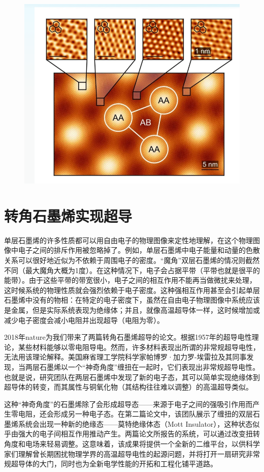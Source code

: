 \documentclass[hyperref,a4paper,UTF8]{ctexart}
\begin{document}
\begin{figure}[h]
	\centering
	\includegraphics[scale=0.6]{figures/sm.png}
\end{figure}

\section{转角石墨烯实现超导}
单层石墨烯的许多性质都可以用自由电子的物理图像来定性地理解，在这个物理图像中电子之间的排斥作用被忽略掉了。例如，单层石墨烯中电子能量和动量的色散关系可以很好地近似为不依赖于周围电子的密度。“魔角”双层石墨烯的情况则截然不同（最大魔角大概为1度）。在这种情况下，电子会占据平带（平带也就是很平的能带）。由于这些平带的带宽很小，电子之间的相互作用不能再当做微扰来处理，这时候系统的物理性质就会强烈依赖于电子密度。这种强相互作用甚至会引起单层石墨烯中没有的物相：在特定的电子密度下，虽然在自由电子物理图像中系统应该是金属，但是实际系统表现为绝缘体；并且，就像高温超导体一样，这时候增加或减少电子密度会减小电阻并出现超导（电阻为零）。

2018年nature为我们带来了两篇转角石墨烯超导的论文。根据1957年的超导电性理论，某些材料能够以零电阻导电。然而，许多材料表现出所谓的非常规超导电性，无法用该理论解释。美国麻省理工学院科学家帕博罗·加力罗-埃雷拉及其同事发现，当两层石墨烯以一个“神奇角度”缠扭在一起时，它们表现出非常规超导电性。也就是说，研究团队在两层石墨烯中发现了新的电子态，其可以简单实现绝缘体到超导体的转变，而其属性与铜氧化物（其结构往往难以调整）的高温超导类似。

这种“神奇角度”的石墨烯除了会形成超导态——来源于电子之间的强吸引作用而产生零电阻，还会形成另一种电子态。在第二篇论文中，该团队展示了缠扭的双层石墨烯系统会出现一种新的绝缘态——莫特绝缘体态（Mott Insulator），这种状态似乎由强大的电子间相互作用推动产生。两篇论文所报告的系统，可以通过改变扭转角度和电场来轻易调整。这意味着，该成果将提供一个全新的二维平台，以供科学家们理解曾长期困扰物理学界的高温超导电性的起源问题，并将打开一扇研究非常规超导体的大门，同时也为全新电学性能的开拓和工程化铺平道路。
\end{document}
